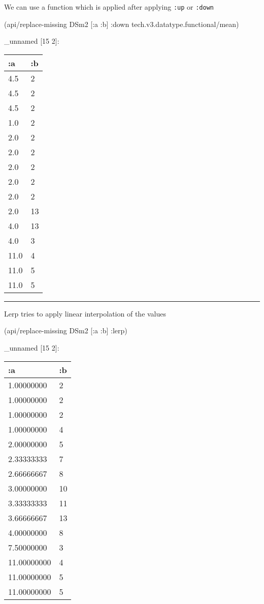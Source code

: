 \documentclass[]{article}
\newenvironment{Shaded}{\begin{snugshade}}{\end{snugshade}}
\newcommand{\AttributeTok}[1]{\textcolor[rgb]{0.77,0.63,0.00}{#1}}
\newcommand{\NormalTok}[1]{#1}
\begin{document}
We can use a function which is applied after applying \texttt{:up} or
\texttt{:down}

\begin{Shaded}
\begin{Highlighting}[]
\NormalTok{(api/replace-missing DSm2 [}\AttributeTok{:a} \AttributeTok{:b}\NormalTok{] }\AttributeTok{:down}\NormalTok{ tech.v3.datatype.functional/mean)}
\end{Highlighting}
\end{Shaded}

\_unnamed {[}15 2{]}:

\begin{longtable}[]{@{}ll@{}}
\toprule
:a & :b\tabularnewline
\midrule
\endhead
4.5 & 2\tabularnewline
4.5 & 2\tabularnewline
4.5 & 2\tabularnewline
1.0 & 2\tabularnewline
2.0 & 2\tabularnewline
2.0 & 2\tabularnewline
2.0 & 2\tabularnewline
2.0 & 2\tabularnewline
2.0 & 2\tabularnewline
2.0 & 13\tabularnewline
4.0 & 13\tabularnewline
4.0 & 3\tabularnewline
11.0 & 4\tabularnewline
11.0 & 5\tabularnewline
11.0 & 5\tabularnewline
\bottomrule
\end{longtable}

\begin{center}\rule{0.5\linewidth}{0.5pt}\end{center}

Lerp tries to apply linear interpolation of the values

\begin{Shaded}
\begin{Highlighting}[]
\NormalTok{(api/replace-missing DSm2 [}\AttributeTok{:a} \AttributeTok{:b}\NormalTok{] }\AttributeTok{:lerp}\NormalTok{)}
\end{Highlighting}
\end{Shaded}

\_unnamed {[}15 2{]}:

\begin{longtable}[]{@{}ll@{}}
\toprule
:a & :b\tabularnewline
\midrule
\endhead
1.00000000 & 2\tabularnewline
1.00000000 & 2\tabularnewline
1.00000000 & 2\tabularnewline
1.00000000 & 4\tabularnewline
2.00000000 & 5\tabularnewline
2.33333333 & 7\tabularnewline
2.66666667 & 8\tabularnewline
3.00000000 & 10\tabularnewline
3.33333333 & 11\tabularnewline
3.66666667 & 13\tabularnewline
4.00000000 & 8\tabularnewline
7.50000000 & 3\tabularnewline
11.00000000 & 4\tabularnewline
11.00000000 & 5\tabularnewline
11.00000000 & 5\tabularnewline
\bottomrule
\end{longtable}
\end{document}
